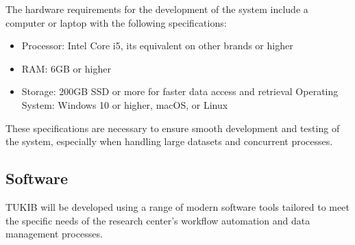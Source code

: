 The hardware requirements for the development of the system include a computer or laptop with the following specifications:

\begin{itemize}
	\item Processor: Intel Core i5, its equivalent on other brands or higher
	\item RAM: 6GB or higher
	\item Storage: 200GB SSD or more for faster data access and retrieval
	Operating System: Windows 10 or higher, macOS, or Linux
\end{itemize}

These specifications are necessary to ensure smooth development and testing of the system, especially when handling large datasets and concurrent processes.

\subsection{Software}

TUKIB will be developed using a range of modern software tools tailored to meet the specific needs of the research center’s workflow automation and data management processes.

